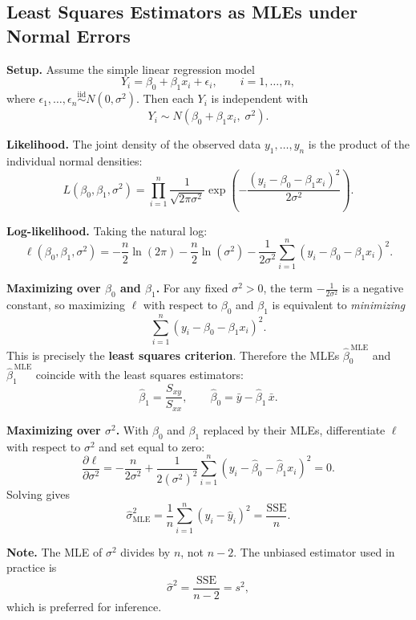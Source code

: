 \subsection*{Least Squares Estimators as MLEs under Normal Errors}

\textbf{Setup.}
Assume the simple linear regression model
\[
  Y_i = \beta_0 + \beta_1 x_i + \epsilon_i, \qquad i = 1, \ldots, n,
\]
where $\epsilon_1, \ldots, \epsilon_n \stackrel{\text{iid}}{\sim} N(0,\sigma^2)$.
Then each $Y_i$ is independent with
\[
  Y_i \sim N(\beta_0 + \beta_1 x_i,\; \sigma^2).
\]

\textbf{Likelihood.}
The joint density of the observed data $y_1, \ldots, y_n$ is the product of the individual normal densities:
\[
  L(\beta_0, \beta_1, \sigma^2)
  = \prod_{i=1}^n \frac{1}{\sqrt{2\pi\sigma^2}}
    \exp\!\left(-\frac{(y_i - \beta_0 - \beta_1 x_i)^2}{2\sigma^2}\right).
\]

\textbf{Log-likelihood.}
Taking the natural log:
\[
  \ell(\beta_0, \beta_1, \sigma^2)
  = -\frac{n}{2}\ln(2\pi)
    - \frac{n}{2}\ln(\sigma^2)
    - \frac{1}{2\sigma^2}\sum_{i=1}^n (y_i - \beta_0 - \beta_1 x_i)^2.
\]

\textbf{Maximizing over $\beta_0$ and $\beta_1$.}
For any fixed $\sigma^2 > 0$, the term $-\frac{1}{2\sigma^2}$ is a negative constant, so maximizing $\ell$ with respect to $\beta_0$ and $\beta_1$ is equivalent to \emph{minimizing}
\[
  \sum_{i=1}^n (y_i - \beta_0 - \beta_1 x_i)^2.
\]
This is precisely the \textbf{least squares criterion}.  Therefore the MLEs $\hat{\beta}_0^{\,\text{MLE}}$ and $\hat{\beta}_1^{\,\text{MLE}}$ coincide with the least squares estimators:
\[
  \hat{\beta}_1 = \frac{S_{xy}}{S_{xx}}, \qquad
  \hat{\beta}_0 = \bar{y} - \hat{\beta}_1\,\bar{x}.
\]

\textbf{Maximizing over $\sigma^2$.}
With $\beta_0$ and $\beta_1$ replaced by their MLEs, differentiate $\ell$ with respect to $\sigma^2$ and set equal to zero:
\[
  \frac{\partial \ell}{\partial \sigma^2}
  = -\frac{n}{2\sigma^2}
    + \frac{1}{2(\sigma^2)^2}\sum_{i=1}^n (y_i - \hat{\beta}_0 - \hat{\beta}_1 x_i)^2
  = 0.
\]
Solving gives
\[
  \hat{\sigma}^2_{\text{MLE}} = \frac{1}{n}\sum_{i=1}^n (y_i - \hat{y}_i)^2
  = \frac{\text{SSE}}{n}.
\]

\medskip
\textbf{Note.} The MLE of $\sigma^2$ divides by $n$, not $n-2$.  The unbiased estimator used in practice is
\[
  \hat{\sigma}^2 = \frac{\text{SSE}}{n-2} = s^2,
\]
which is preferred for inference.